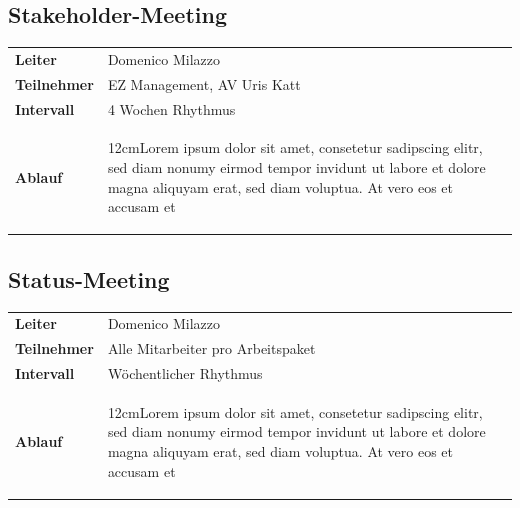 \documentclass[a4paper,10pt]{scrartcl}
\newcommand\Absatz[2][12cm]{\begin{varwidth}{#1}\flushleft#2\end{varwidth}}
\begin{document}
\subsection{Stakeholder-Meeting}
\begin{tabular}{ll} 
\toprule
\textbf{Leiter} & Domenico Milazzo\\
\textbf{Teilnehmer}  & EZ Management, AV Uris Katt\\
\midrule 
\textbf{Intervall}  & 4 Wochen Rhythmus\\
\midrule 
\textbf{Ablauf}  & {\Absatz{Lorem ipsum dolor sit amet, consetetur sadipscing elitr, sed diam nonumy eirmod tempor invidunt ut labore et dolore magna aliquyam erat, sed diam voluptua. At vero eos et accusam et \linebreak}}\\
\bottomrule
\end{tabular}
\vspace{5mm}

\subsection{Status-Meeting}
\begin{tabular}{ll} 
\toprule
\textbf{Leiter} & Domenico Milazzo\\
\textbf{Teilnehmer}  & Alle Mitarbeiter pro Arbeitspaket\\
\midrule 
\textbf{Intervall}  & Wöchentlicher Rhythmus\\
\midrule 
\textbf{Ablauf}  & {\Absatz{Lorem ipsum dolor sit amet, consetetur sadipscing elitr, sed diam nonumy eirmod tempor invidunt ut labore et dolore magna aliquyam erat, sed diam voluptua. At vero eos et accusam et \linebreak}}\\
\bottomrule
\end{tabular}
\end{document}

